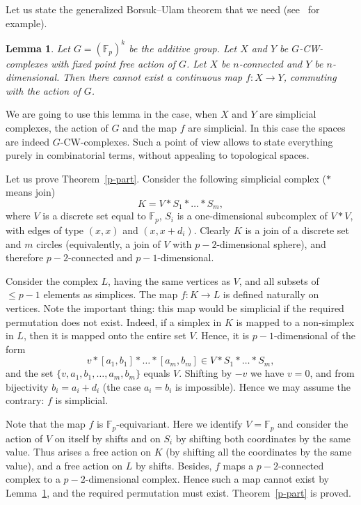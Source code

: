 \documentclass[12pt,a4paper]{amsart}
\newtheorem{lem}{Lemma}
\theoremstyle{definition}
\theoremstyle{remark}
\begin{document}
Let us state the generalized Borsuk--Ulam theorem that we need (see~\cite{vol2000} for example).

\begin{lem}
\label{bu-pk}
Let $G=({{\mathbb F_p}})^k$ be the additive group. Let $X$ and $Y$ be $G$-CW-complexes
with fixed point free action of $G$. Let $X$ be $n$-connected and
$Y$ be $n$-dimensional. Then there cannot exist a continuous
map $f: X\to Y$, commuting with the action of $G$.
\end{lem}

We are going to use this lemma in the case, when $X$ and $Y$ are simplicial complexes, the action of $G$ and the map $f$ are simplicial. In this case the spaces are indeed $G$-CW-complexes. Such a point of view allows to state everything purely in combinatorial terms, without appealing to topological spaces.

Let us prove Theorem~\ref{p-part}. Consider the following simplicial complex ($*$ means join)
$$
K = V*S_1*\dots*S_m,
$$
where $V$ is a discrete set equal to ${{\mathbb F_p}}$, $S_i$ is a one-dimensional subcomplex of $V*V$, with edges of type $(x, x)$ and $(x, x+d_i)$. Clearly $K$ is a join of a discrete set and $m$ circles (equivalently, a join of $V$ with $p-2$-dimensional sphere), and therefore $p-2$-connected and $p-1$-dimensional.

Consider the complex $L$, having the same vertices as $V$, and all subsets of $\le p-1$ elements as simplices. The map $f:K\to L$ is defined naturally on vertices. Note the important thing: this map would be simplicial if the required permutation does not exist. Indeed, if a simplex in $K$ is mapped to a non-simplex in $L$, then it is mapped onto the entire set $V$. Hence, it is $p-1$-dimensional of the form
$$
v*[a_1, b_1]*\dots*[a_m, b_m]\in V*S_1*\dots*S_m,
$$
and the set $\{v, a_1, b_1, \ldots, a_m, b_m\}$ equals $V$. Shifting by $-v$ we have $v=0$, and from bijectivity $b_i=a_i+d_i$ (the case $a_i=b_i$ is impossible). Hence we may assume the contrary: $f$ is simplicial.

Note that the map $f$ is ${{\mathbb F_p}}$-equivariant. Here we identify $V={{\mathbb F_p}}$ and consider the action of $V$ on itself by shifts and on $S_i$ by shifting both coordinates by the same value. Thus arises a free action on $K$ (by shifting all the coordinates by the same value), and a free action on $L$ by shifts. Besides, $f$ maps a $p-2$-connected complex to a $p-2$-dimensional complex. Hence such a map cannot exist by Lemma~\ref{bu-pk}, and the required permutation must exist. Theorem~\ref{p-part} is proved.
\end{document}
